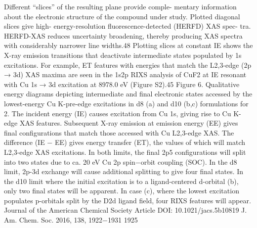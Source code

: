 Diﬀerent “slices” of the resulting plane provide comple-
mentary information about the electronic structure of the
compound under study. Plotted diagonal slices give high-
energy-resolution ﬂuorescence-detected (HERFD) XAS spec-
tra. HERFD-XAS reduces uncertainty broadening, thereby
producing XAS spectra with considerably narrower line
widths.48 Plotting slices at constant IE shows the X-ray
emission transitions that deactivate intermediate states
populated by 1s excitations. For example, ET features with
energies that match the L2,3-edge (2p → 3d) XAS maxima are
seen in the 1s2p RIXS analysis of CuF2 at IE resonant with Cu
1s → 3d excitation at 8978.0 eV (Figure S2).45
Figure 6. Qualitative energy diagrams depicting intermediate and ﬁnal
electronic states accessed by the lowest-energy Cu K-pre-edge
excitations in d8 (a) and d10 (b,c) formulations for 2. The incident
energy (IE) causes excitation from Cu 1s, giving rise to Cu K-edge
XAS features. Subsequent X-ray emission at emission energy (EE)
gives ﬁnal conﬁgurations that match those accessed with Cu L2,3-edge
XAS. The diﬀerence (IE − EE) gives energy transfer (ET), the values
of which will match L2,3-edge XAS excitations. In both limits, the ﬁnal
2p5 conﬁgurations will split into two states due to ca. 20 eV Cu 2p
spin−orbit coupling (SOC). In the d8 limit, 2p-3d exchange will cause
additional splitting to give four ﬁnal states. In the d10 limit where the
initial excitation is to a ligand-centered d-orbital (b), only two ﬁnal
states will be apparent. In case (c), where the lowest excitation
populates p-orbitals split by the D2d ligand ﬁeld, four RIXS features
will appear.
Journal of the American Chemical Society
Article
DOI: 10.1021/jacs.5b10819
J. Am. Chem. Soc. 2016, 138, 1922−1931
1925


